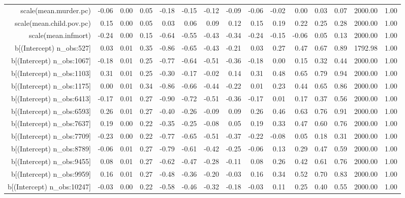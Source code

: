 \begin{table}[ht]
\begin{tabular}{rrrrrrrrrrrrrrr}
  scale(mean.murder.pc) & -0.06 & 0.00 & 0.05 & -0.18 & -0.15 & -0.12 & -0.09 & -0.06 & -0.02 & 0.00 & 0.03 & 0.07 & 2000.00 & 1.00 \\ 
  scale(mean.child.pov.pc) & 0.15 & 0.00 & 0.05 & 0.03 & 0.06 & 0.09 & 0.12 & 0.15 & 0.19 & 0.22 & 0.25 & 0.28 & 2000.00 & 1.00 \\ 
  scale(mean.infmort) & -0.24 & 0.00 & 0.15 & -0.64 & -0.55 & -0.43 & -0.34 & -0.24 & -0.15 & -0.06 & 0.05 & 0.13 & 2000.00 & 1.00 \\ 
  b[(Intercept) n\_obs:527] & 0.03 & 0.01 & 0.35 & -0.86 & -0.65 & -0.43 & -0.21 & 0.03 & 0.27 & 0.47 & 0.67 & 0.89 & 1792.98 & 1.00 \\ 
  b[(Intercept) n\_obs:1067] & -0.18 & 0.01 & 0.25 & -0.77 & -0.64 & -0.51 & -0.36 & -0.18 & 0.00 & 0.15 & 0.32 & 0.44 & 2000.00 & 1.00 \\ 
  b[(Intercept) n\_obs:1103] & 0.31 & 0.01 & 0.25 & -0.30 & -0.17 & -0.02 & 0.14 & 0.31 & 0.48 & 0.65 & 0.79 & 0.94 & 2000.00 & 1.00 \\ 
  b[(Intercept) n\_obs:1175] & 0.00 & 0.01 & 0.34 & -0.86 & -0.66 & -0.44 & -0.22 & 0.01 & 0.23 & 0.44 & 0.65 & 0.86 & 2000.00 & 1.00 \\ 
  b[(Intercept) n\_obs:6413] & -0.17 & 0.01 & 0.27 & -0.90 & -0.72 & -0.51 & -0.36 & -0.17 & 0.01 & 0.17 & 0.37 & 0.56 & 2000.00 & 1.00 \\ 
  b[(Intercept) n\_obs:6593] & 0.26 & 0.01 & 0.27 & -0.40 & -0.26 & -0.09 & 0.09 & 0.26 & 0.46 & 0.63 & 0.76 & 0.91 & 2000.00 & 1.00 \\ 
  b[(Intercept) n\_obs:7637] & 0.19 & 0.00 & 0.22 & -0.35 & -0.25 & -0.08 & 0.05 & 0.19 & 0.33 & 0.47 & 0.60 & 0.76 & 2000.00 & 1.00 \\ 
  b[(Intercept) n\_obs:7709] & -0.23 & 0.00 & 0.22 & -0.77 & -0.65 & -0.51 & -0.37 & -0.22 & -0.08 & 0.05 & 0.18 & 0.31 & 2000.00 & 1.00 \\ 
  b[(Intercept) n\_obs:8789] & -0.06 & 0.01 & 0.27 & -0.79 & -0.61 & -0.42 & -0.25 & -0.06 & 0.13 & 0.29 & 0.47 & 0.59 & 2000.00 & 1.00 \\ 
  b[(Intercept) n\_obs:9455] & 0.08 & 0.01 & 0.27 & -0.62 & -0.47 & -0.28 & -0.11 & 0.08 & 0.26 & 0.42 & 0.61 & 0.76 & 2000.00 & 1.00 \\ 
  b[(Intercept) n\_obs:9959] & 0.16 & 0.01 & 0.27 & -0.48 & -0.36 & -0.20 & -0.03 & 0.16 & 0.34 & 0.52 & 0.70 & 0.83 & 2000.00 & 1.00 \\ 
  b[(Intercept) n\_obs:10247] & -0.03 & 0.00 & 0.22 & -0.58 & -0.46 & -0.32 & -0.18 & -0.03 & 0.11 & 0.25 & 0.40 & 0.55 & 2000.00 & 1.00 \\ 

\end{tabular}
\end{table}
